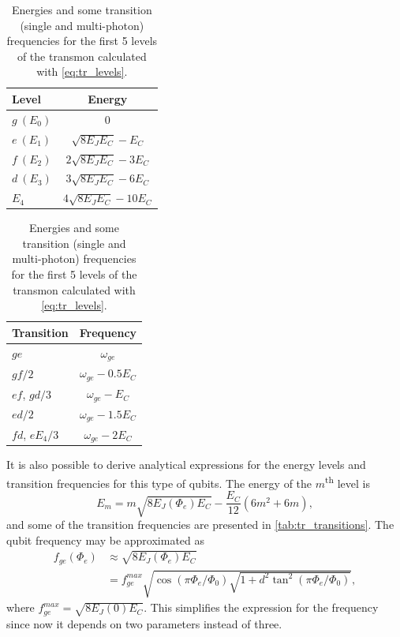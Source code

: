 \documentclass[%
 aip,
 amsmath,amssymb,
 reprint,%
]{revtex4-1}
\begin{document}
\begin{table}
	\centering
	\begin{tabular}{l|c}
		Level & Energy\\
		\hline
		$g\ (E_0)$ & 0\\
		$e\ (E_1)$ & $\sqrt{8E_J E_C} - E_C$\\
		$f\ (E_2)$ & $2\sqrt{8E_J E_C} - 3 E_C$\\
		$d\ (E_3)$ & $3\sqrt{8E_J E_C} - 6 E_C$\\
		$E_4$ & $4\sqrt{8E_J E_C} - 10 E_C$\\
		\hline
	\end{tabular}\quad
	\begin{tabular}{l|c}
		Transition & Frequency\\
		\hline
		$ge$ & $\omega_{ge}$ \\
		$gf/2$ & $\omega_{ge} - 0.5 E_C$\\
		$ef$, $gd/3$& $\omega_{ge}-E_C$\\
		$ed/2$ & $\omega_{ge} - 1.5 E_C$\\
		$fd$, $e E_4/3$ & $\omega_{ge}-2 E_C$\\
		\hline
	\end{tabular}
	\caption{Energies and some transition (single and multi-photon) frequencies for the first 5 levels of the transmon calculated with \eqref{eq:tr_levels}.}
	\label{tab:tr_transitions}
\end{table}
It is also possible to derive analytical expressions for the energy levels and transition frequencies for this type of qubits. The energy of the $m$\textsuperscript{th} level is \cite{koch2007}
\begin{equation}
E_m = m \sqrt{8E_J(\Phi_e) E_C} -\frac{E_C}{12}(6m^2+6m),
\label{eq:tr_levels}
\end{equation}
and some of the transition frequencies are presented in \autoref{tab:tr_transitions}. The qubit frequency  may be approximated as 
\begin{equation}
\begin{aligned}
f_{ge}(\Phi_e) &\approx \sqrt{8 E_J (\Phi_e) E_C} \\
&= f_{ge}^{max} \sqrt{\cos\left(\pi \Phi_e/\Phi_0\right) \sqrt{1+d^2 \tan^2 \left(\pi \Phi_e/\Phi_0\right)}},
\end{aligned}
\end{equation}
where $f_{ge}^{max} = \sqrt{8 E_J(0) E_C}$. This simplifies the expression for the frequency since now it depends on two parameters instead of three.
\end{document}
